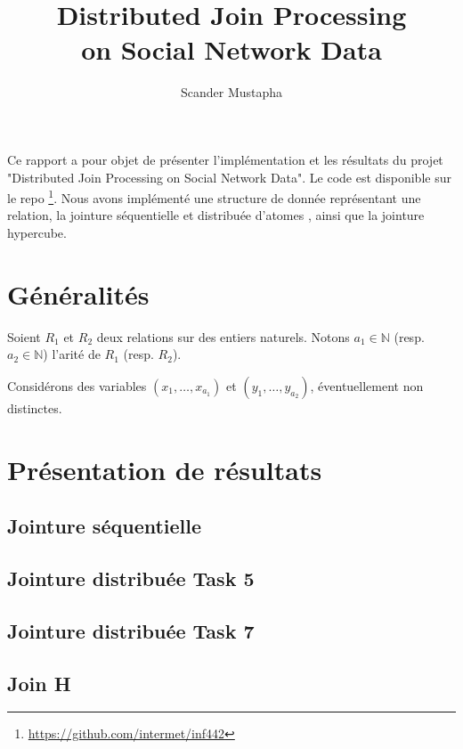 \documentclass[12pt]{article}
\author{Scander Mustapha}
\title{Distributed Join Processing\\ on Social Network Data}
\affil{\'Ecole polytechnique}
\begin{document}
\maketitle
\let\olditem\item
\renewcommand{\item}{\olditem[$\bullet$]}

Ce rapport a pour objet de présenter l'implémentation et les résultats du projet "Distributed Join Processing on Social Network Data". Le code est disponible sur le repo \footnote{\url{https://github.com/intermet/inf442}}. Nous avons implémenté une structure de donnée représentant une relation, la jointure séquentielle et distribuée d'atomes , ainsi que la jointure hypercube.

\section{Généralités}
Soient $R_1$ et $R_2$ deux relations sur des entiers naturels.
Notons $a_1 \in \mathbb{N}$ (resp. $a_2 \in \mathbb{N}$) l'arité de $R_1$ (resp. $R_2$).

Considérons des variables $(x_1, \dots, x_{a_1})$ et $(y_1, \dots, y_{a_2})$, éventuellement non distinctes.

\section{Présentation de résultats}

\subsection{Jointure séquentielle}

\subsection{Jointure distribuée Task 5}

\subsection{Jointure distribuée Task 7}

\subsection{Join H}
\end{document}
